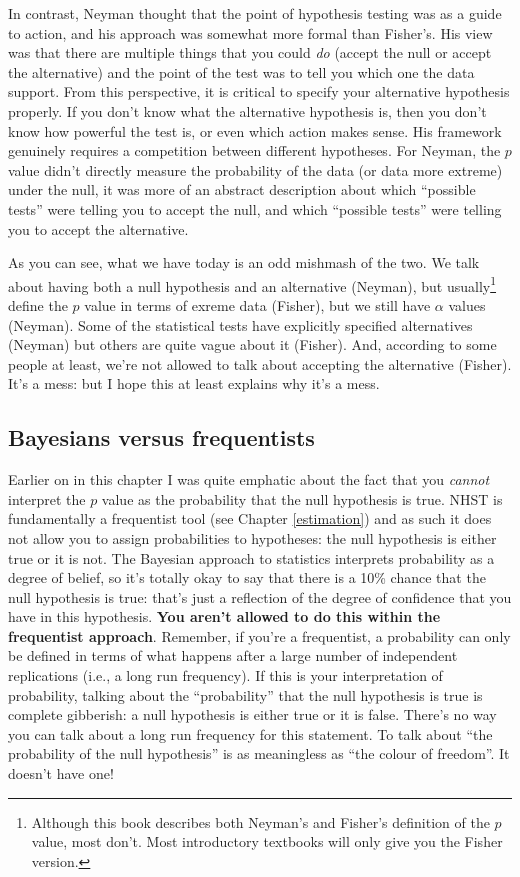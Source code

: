 \documentclass[
]{book}
\begin{document}
In contrast, Neyman thought that the point of hypothesis testing was as a guide to action, and his approach was somewhat more formal than Fisher's. His view was that there are multiple things that you could \emph{do} (accept the null or accept the alternative) and the point of the test was to tell you which one the data support. From this perspective, it is critical to specify your alternative hypothesis properly. If you don't know what the alternative hypothesis is, then you don't know how powerful the test is, or even which action makes sense. His framework genuinely requires a competition between different hypotheses. For Neyman, the \(p\) value didn't directly measure the probability of the data (or data more extreme) under the null, it was more of an abstract description about which ``possible tests'' were telling you to accept the null, and which ``possible tests'' were telling you to accept the alternative.

As you can see, what we have today is an odd mishmash of the two. We talk about having both a null hypothesis and an alternative (Neyman), but usually\footnote{Although this book describes both Neyman's and Fisher's definition of the \(p\) value, most don't. Most introductory textbooks will only give you the Fisher version.} define the \(p\) value in terms of exreme data (Fisher), but we still have \(\alpha\) values (Neyman). Some of the statistical tests have explicitly specified alternatives (Neyman) but others are quite vague about it (Fisher). And, according to some people at least, we're not allowed to talk about accepting the alternative (Fisher). It's a mess: but I hope this at least explains why it's a mess.

\hypertarget{bayesians-versus-frequentists}{%
\subsection{Bayesians versus frequentists}\label{bayesians-versus-frequentists}}

Earlier on in this chapter I was quite emphatic about the fact that you \emph{cannot} interpret the \(p\) value as the probability that the null hypothesis is true. NHST is fundamentally a frequentist tool (see Chapter \ref{estimation}) and as such it does not allow you to assign probabilities to hypotheses: the null hypothesis is either true or it is not. The Bayesian approach to statistics interprets probability as a degree of belief, so it's totally okay to say that there is a 10\% chance that the null hypothesis is true: that's just a reflection of the degree of confidence that you have in this hypothesis. \textbf{You aren't allowed to do this within the frequentist approach}. Remember, if you're a frequentist, a probability can only be defined in terms of what happens after a large number of independent replications (i.e., a long run frequency). If this is your interpretation of probability, talking about the ``probability'' that the null hypothesis is true is complete gibberish: a null hypothesis is either true or it is false. There's no way you can talk about a long run frequency for this statement. To talk about ``the probability of the null hypothesis'' is as meaningless as ``the colour of freedom''. It doesn't have one!
\end{document}
